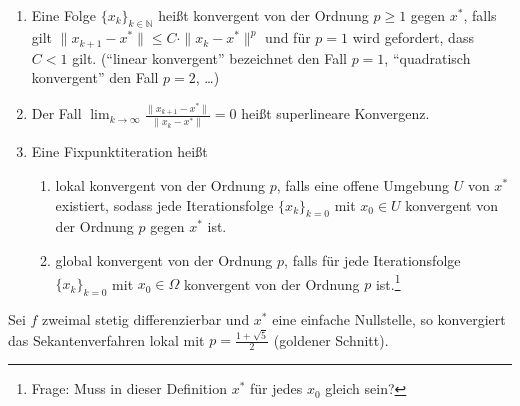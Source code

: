 \begin{definition}[Konvergenzordnung]
~
\begin{enumerate}
\item Eine Folge $\{x_k \}_{k\in\mathbb{N}}$ heißt konvergent von der Ordnung $p\geq 1$ gegen $x^*$,
falls gilt $\| x_{k+1}-x^*\|\leq C\cdot \|x_k-x^*\|^p$ und für $p=1$ wird gefordert, dass $C<1$ gilt.
(``linear konvergent'' bezeichnet den Fall $p=1$, ``quadratisch konvergent'' den Fall
$p=2$, \ldots) %
\item Der Fall $\lim_{k \to \infty}\frac{\|x_{k+1}-x^*\|}{\|x_k -x^*\|}=0$ heißt superlineare Konvergenz.
\item Eine Fixpunktiteration heißt
  \begin{enumerate}
  \item lokal konvergent von der Ordnung $p$, falls eine offene Umgebung $U$ von $x^*$ existiert,
        sodass jede Iterationsfolge $\{x_k\}_{k=0}$ mit $x_0\in U$ konvergent
        von der Ordnung $p$ gegen $x^*$ ist.
  \item global konvergent von der Ordnung $p$, falls für jede Iterationsfolge
        $\{x_k\}_{k=0}$ mit $x_0\in \Omega$ konvergent von der Ordnung $p$
ist.\footnote{Frage: Muss in dieser Definition $x^*$ für jedes $x_0$ gleich sein?} %
  \end{enumerate}
\end{enumerate}
\end{definition}

\begin{lemma}
Sei $f$ zweimal stetig differenzierbar und $x^*$ eine einfache Nullstelle, so
konvergiert das Sekantenverfahren lokal mit $p=\frac{1+\sqrt{5}}{2}$
(goldener Schnitt).
\end{lemma}

